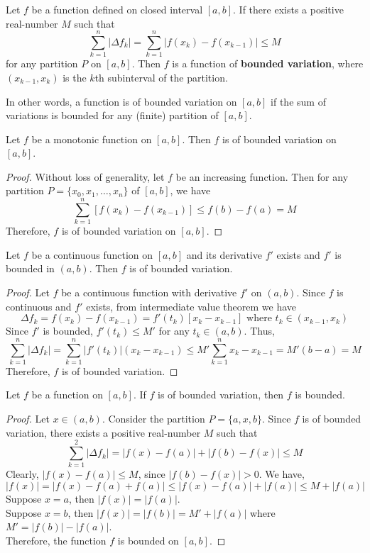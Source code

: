 \begin{definition}
	Let $f$ be a function defined on closed interval $[a,b]$.
	If there exists a positive real-number $M$ such that
	\[ \sum_{k=1}^n |\Delta f_k| = \sum_{k=1}^n |f(x_k) - f(x_{k-1})| \le M \]
	for any partition $P$ on $[a,b]$.
	Then $f$ is a function of \textbf{bounded variation}, where $(x_{k-1},x_k)$ is the $k$th subinterval of the partition.\\

\begin{commentary}
	In other words, a function is of bounded variation on $[a,b]$ if the sum of variations is bounded for any (finite) partition of $[a,b]$.
\end{commentary}
\end{definition}

\begin{theorem}
	Let $f$ be a monotonic function on $[a,b]$.
	Then $f$ is of bounded variation on $[a,b]$.
\end{theorem}
\begin{proof}
	Without loss of generality, let $f$ be an increasing function.
	Then for any partition $P = \{x_0,x_1,\dots,x_n\}$ of $[a,b]$, we have
	\[ \sum_{k=1}^n \left[ f(x_k)-f(x_{k-1}) \right] \le f(b)-f(a) = M \]
	Therefore, $f$ is of bounded variation on $[a,b]$.
\end{proof}

\begin{theorem}
	Let $f$ be a continuous function on $[a,b]$ and its derivative $f'$ exists and $f'$ is bounded in $(a,b)$.
	Then $f$ is of bounded variation.	
\end{theorem}
\begin{proof}
	Let $f$ be a continuous function with derivative $f'$ on $(a,b)$.
	Since $f$ is continuous and $f'$ exists, from intermediate value theorem we have
	\[ \Delta f_k = f(x_k) - f(x_{k-1}) = f'(t_k) [x_k-x_{k-1}] \text{ where } t_k \in (x_{k-1},x_k) \]
	Since $f'$ is bounded, $f'(t_k) \le M'$ for any $t_k \in (a,b)$.
	Thus,
	\[ \sum_{k=1}^n |\Delta f_k| = \sum_{k=1}^n |f'(t_k)| (x_k-x_{k-1}) \le M'\sum_{k=1}^n x_k-x_{k-1} = M'(b-a) = M \]
	Therefore, $f$ is of bounded variation.
\end{proof}

\begin{theorem}
	Let $f$ be a function on $[a,b]$.
	If $f$ is of bounded variation, then $f$ is bounded.
\end{theorem}
\begin{proof}
	Let $x \in (a,b)$.
	Consider the partition $P = \{ a,x,b \}$.
	Since $f$ is of bounded variation, there exists a positive real-number $M$ such that
	\[ \sum_{k=1}^2 |\Delta f_k| = |f(x)-f(a)| + |f(b)-f(x)| \le M \]
	Clearly, $|f(x)-f(a)| \le M$, since $|f(b)-f(x)| > 0$.
	We have,
	\[ |f(x)| = |f(x)-f(a)+f(a)| \le |f(x)-f(a)|+|f(a)| \le M+|f(a)| \]
	Suppose $x = a$, then $|f(x)| = |f(a)|$.\\
	Suppose $x = b$, then $|f(x)| = |f(b)| = M' + |f(a)|$ where $M' = |f(b)|-|f(a)|$.\\

	Therefore, the function $f$ is bounded on $[a,b]$.
\end{proof}

